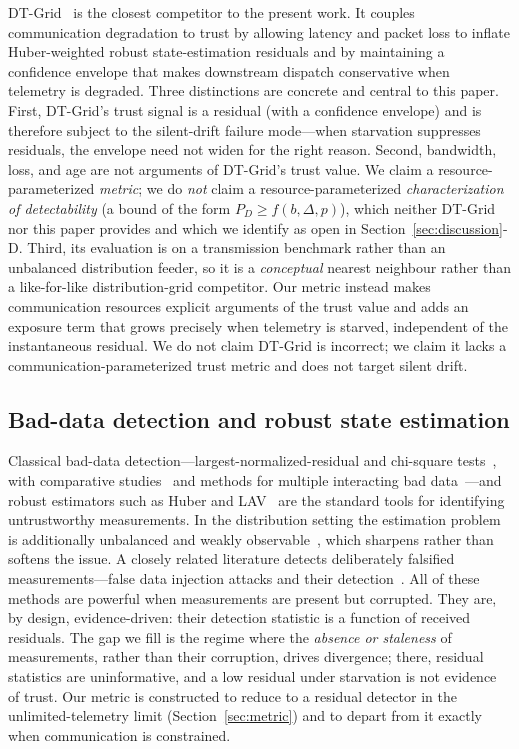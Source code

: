 \documentclass[journal]{IEEEtran}
\theoremstyle{plain}
\theoremstyle{definition}
\theoremstyle{remark}
\begin{document}
DT-Grid~\cite{dtgrid2026} is the closest competitor to the present work.
It couples communication degradation to trust by allowing latency and
packet loss to inflate Huber-weighted robust state-estimation residuals
and by maintaining a confidence envelope that makes downstream dispatch
conservative when telemetry is degraded. Three distinctions are concrete
and central to this paper. First, DT-Grid's trust signal is a residual
(with a confidence envelope) and is therefore subject to the silent-drift
failure mode---when starvation suppresses residuals, the envelope need not
widen for the right reason. Second, bandwidth, loss, and age are not arguments of DT-Grid's trust
value. We claim a resource-parameterized \emph{metric}; we do \emph{not}
claim a resource-parameterized \emph{characterization of detectability}
(a bound of the form $P_D\ge f(b,\Delta,p)$), which neither DT-Grid nor
this paper provides and which we identify as open in
Section~\ref{sec:discussion}-D. Third, its evaluation
is on a transmission benchmark rather than an unbalanced distribution
feeder, so it is a \emph{conceptual} nearest neighbour rather than a
like-for-like distribution-grid competitor. Our metric instead makes
communication resources explicit arguments of the trust value and adds an
exposure term that grows precisely when telemetry is starved, independent
of the instantaneous residual. We do not claim DT-Grid is incorrect; we
claim it lacks a communication-parameterized trust metric and does not
target silent drift.

\subsection{Bad-data detection and robust state estimation}
Classical bad-data detection---largest-normalized-residual and chi-square
tests~\cite{abur2004,handschin1975}, with comparative
studies~\cite{mili1985} and methods for multiple interacting bad
data~\cite{cheniae1996}---and robust estimators such as Huber and
LAV~\cite{gol2014lav,gol2014three,monticelli1999,wang2017robust} are the
standard tools for identifying untrustworthy measurements. In the
distribution setting the estimation problem is additionally unbalanced and
weakly observable~\cite{baran1994,singh2009}, which sharpens rather than
softens the issue. A closely related literature detects deliberately
falsified measurements---false data injection attacks and their
detection~\cite{liu2011,kosut2011,liang2017,chaojun2015,he2017}. All of
these methods are powerful when measurements are present but corrupted.
They are, by design, evidence-driven: their detection statistic is a
function of received residuals. The gap we fill is the regime where the
\emph{absence or staleness} of measurements, rather than their corruption,
drives divergence; there, residual statistics are uninformative, and a low
residual under starvation is not evidence of trust. Our metric is
constructed to reduce to a residual detector in the unlimited-telemetry
limit (Section~\ref{sec:metric}) and to depart from it exactly when
communication is constrained.
\end{document}
